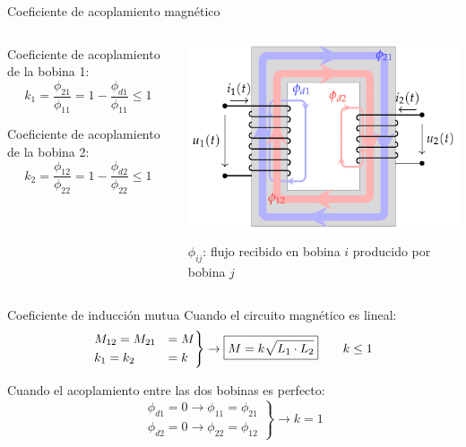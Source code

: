 \documentclass[aspectratio=169, usenames,svgnames,dvipsnames]{beamer}
\begin{document}
\begin{frame}[label={sec:orgb03dd2f}]{Coeficiente de acoplamiento magnético}
\begin{columns}
\begin{column}{0.4\columnwidth}
Coeficiente de acoplamiento de la bobina 1:
\[
  k_1 = \frac{\phi_{21}}{\phi_{11}} = 1 - \frac{\phi_{d1}}{\phi_{11}} \leq 1
\]

Coeficiente de acoplamiento de la bobina 2:
\[
  k_2 = \frac{\phi_{12}}{\phi_{22}} = 1 - \frac{\phi_{d2}}{\phi_{22}} \leq 1
\]
\end{column}
\begin{column}{0.6\columnwidth}
\begin{center}
\includegraphics[height=0.7\textheight]{../figs/acoplamientoTikz.pdf}
\end{center}

\begin{center}
\(\phi_{ij}\): flujo recibido en bobina \(i\) producido por bobina \(j\)
\end{center}
\end{column}
\end{columns}
\end{frame}

\begin{frame}[label={sec:org42ee0ee}]{Coeficiente de inducción mutua}
Cuando el circuito magnético es \alert{lineal}:
\[
  \begin{rcases}
  M_{12} = M_{21} &= M\\
  k_1 = k_2 &= k    
  \end{rcases}
  \rightarrow \boxed{M = k \sqrt{L_1 \cdot L_2}} \qquad  k \leq 1
\]

Cuando el acoplamiento entre las dos bobinas es perfecto:
\[\left.
\begin{array}{cc}
  \phi_{d1} = 0 \rightarrow   \phi_{11} = \phi_{21}\\
  \phi_{d2} = 0 \rightarrow \phi_{22} = \phi_{12} 
  \end{array} \right\} \rightarrow k = 1
\]
\end{frame}
\end{document}
